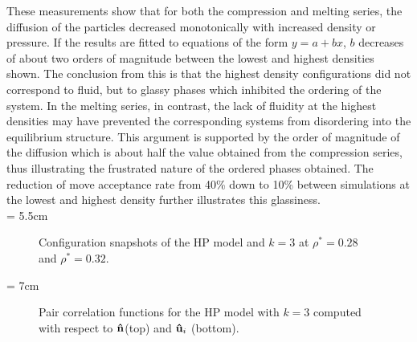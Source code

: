These measurements show that for both the compression and melting series, the
diffusion of the particles decreased monotonically with increased density or pressure. If the
results are fitted to equations of the form $y=a +bx$, $b$ decreases of about two orders of magnitude
between the lowest and highest densities shown. The conclusion from this is that the highest density 
configurations did not correspond to fluid, but to glassy phases which inhibited the ordering of the
system. In the melting series, in contrast, the lack of fluidity at the highest densities 
may have prevented the corresponding systems from disordering into the equilibrium structure. 
This argument is supported by the order of magnitude of the diffusion which is
about half the value obtained from the compression series, thus illustrating the frustrated
nature of the ordered phases obtained. The reduction of move acceptance rate from 40\% down to 10\%
between simulations at the lowest and highest density  further illustrates this glassiness.\\


\picW = 5.5cm
\begin{figure}
	\centering
	\hspace*{2cm}
	\caption{Configuration snapshots of the HP model and $k=3$ at $\rho^{*}=0.28$ and
	$\rho^{*}=0.32$.}
	\label{HP_k3_snaps}
\end{figure}

\picW = 7cm
\begin{figure}
	\centering
	
	\caption{Pair correlation functions for the HP model with $k=3$ computed with respect to
	$\mathbf{\hat{n} }$(top) and $\mathbf{\hat{u} }_i$ (bottom).}
	\label{HP_k3_grs}
\end{figure}


